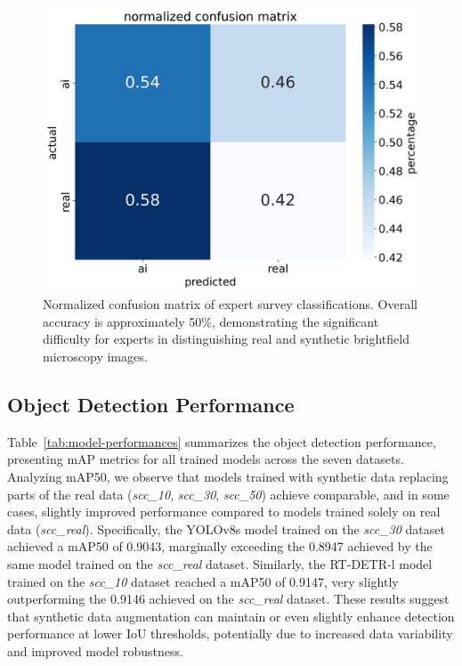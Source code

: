 \begin{figure}[t]
    \centering
    \includegraphics[width=\linewidth]{images/norm_confusion_matrix}
    \caption{Normalized confusion matrix of expert survey classifications. Overall accuracy is approximately 50\%, demonstrating the significant difficulty for experts in distinguishing real and synthetic brightfield microscopy images.}
    \label{fig:conf_matrix}
\end{figure}

\subsection{Object Detection Performance}
\label{subsec:object-detection-performance}
Table~\ref{tab:model-performances} summarizes the object detection performance, presenting mAP metrics for all trained models across the seven datasets.
Analyzing mAP\@50, we observe that models trained with synthetic data replacing parts of the real data (\textit{scc\_10}, \textit{scc\_30}, \textit{scc\_50}) achieve comparable, and in some cases, slightly improved performance compared to models trained solely on real data (\textit{scc\_real}).
Specifically, the YOLOv8s model trained on the \textit{scc\_30} dataset achieved a mAP\@50 of 0.9043, marginally exceeding the 0.8947 achieved by the same model trained on the \textit{scc\_real} dataset.
Similarly, the RT-DETR-l model trained on the \textit{scc\_10} dataset reached a mAP\@50 of 0.9147, very slightly outperforming the 0.9146 achieved on the \textit{scc\_real} dataset.
These results suggest that synthetic data augmentation can maintain or even slightly enhance detection performance at lower IoU thresholds, potentially due to increased data variability and improved model robustness.

